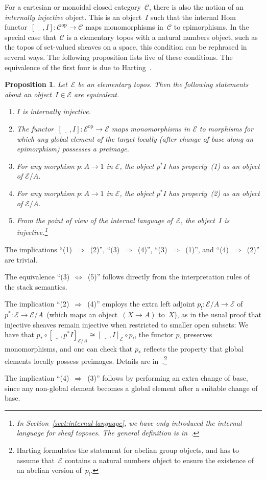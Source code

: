 \documentclass[10pt,reqno,a4paper]{amsbook}
\makeatletter
\theoremstyle{definition}
\theoremstyle{plain}
\newtheorem{prop}[defn]{Proposition}
\theoremstyle{remark}
\newcommand{\C}{\mathcal{C}}
\newcommand{\E}{\mathcal{E}}
\newcommand{\placeholder}{\underline{\quad}}
\newcommand{\op}{\mathrm{op}}
\newcommand{\?}{\,{:}\,}
\renewcommand{\_}{\mathpunct{.}\,}
\renewenvironment{proof}[1][\proofname]{\par
  \pushQED{\qed}%
  \normalfont \topsep6\p@\@plus6\p@\relax
  \trivlist
  \item[\hskip\labelsep
        \itshape
    #1\@addpunct{.}]\ignorespaces
}{%
  \popQED\endtrivlist\@endpefalse
}
\makeatother
\begin{document}
For a cartesian or monoidal closed category~$\C$, there is also the notion of an
\emph{internally injective} object. This is an object~$I$ such that the
internal Hom functor~$[\placeholder, I] : \C^\op \to \C$ maps monomorphisms
in~$\C$ to epimorphisms. In the special case that~$\C$ is a elementary topos
with a natural numbers object, such as the topos of set-valued sheaves on a
space, this condition can be rephrased in several ways. The following
proposition lists five of these conditions. The equivalence of the first four is
due to Harting~\cite{harting}.

\begin{prop}\label{prop:notions-of-internal-injectivity}
Let~$\E$ be an elementary topos. Then
the following statements about an object~$I \in \E$ are equivalent.
\begin{enumerate}
\item $I$ is internally injective.
\item The functor~$[\placeholder, I] : \E^\op \to \E$ maps monomorphisms in $\E$
to morphisms for which any global element of the target locally (after change of
base along an epimorphism) possesses a preimage.
\item For any morphism $p : A \to 1$ in $\E$, the object $p^*I$ has property~(1)
as an object of $\E/A$.
\item For any morphism $p : A \to 1$ in $\E$, the object $p^*I$ has property~(2)
as an object of $\E/A$.
\item From the point of view of the internal language of~$\E$, the object~$I$
is injective.\footnote{In Section~\ref{sect:internal-language}, we have only
introduced the internal language for sheaf toposes. The general definition is
in~\cite[Section~7]{shulman:stack}.}
\end{enumerate}
\end{prop}

\begin{proof}
The implications ``(1)~$\Rightarrow$~(2)'', ``(3)~$\Rightarrow$~(4)'',
``(3)~$\Rightarrow$~(1)'', and ``(4)~$\Rightarrow$~(2)'' are trivial.

The equivalence ``(3)~$\Leftrightarrow$~(5)'' follows directly from the
interpretation rules of the stack semantics.

The implication ``(2)~$\Rightarrow$~(4)'' employs the
extra left adjoint $p_! : \E/A \to \E$ of $p^* : \E
\to \E/A$~(which maps an object~$(X \to A)$ to~$X$), as in the usual proof that
injective sheaves remain injective when
restricted to smaller open subsets: We have that $p_* \circ [\placeholder, p^*I]_{\E/A}
\cong [\placeholder, I]_\E \circ p_!$, the functor $p_!$ preserves monomorphisms, and one
can check that $p_*$ reflects the property that global elements locally possess
preimages. Details are in~\cite[Thm.~1.1]{harting}.\footnote{Harting formulates
the statement for abelian group objects, and has to assume that~$\E$ contains a
natural numbers object to ensure the existence of an abelian version of~$p_!$.}

The implication ``(4)~$\Rightarrow$~(3)'' follows by performing an extra change of
base, since any non-global element becomes a global element after a suitable
change of base.
\end{proof}
\end{document}
